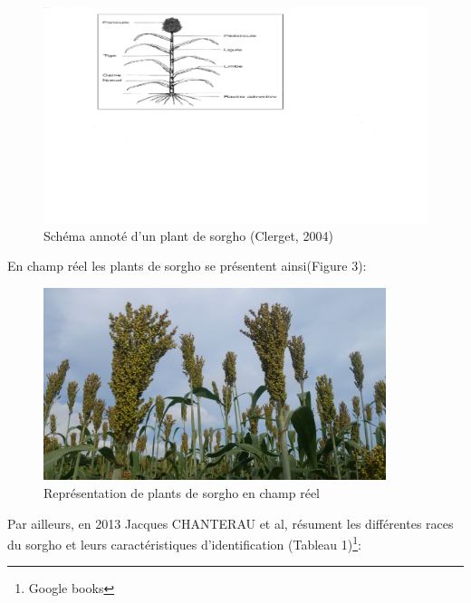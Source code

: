 \documentclass[a4paper,11pt]{article}
\begin{document}

\begin{figure}%
  \begin{center}
    \includegraphics[width=18cm]{images/Schema_Plant_Sorgho}
  \end{center}
\caption{Schéma annoté d’un plant de sorgho (Clerget, 2004)}
\end{figure}


En champ réel les plants de sorgho se présentent ainsi(Figure 3):

\begin{figure}%
  \begin{center}
    \includegraphics[width=10cm]{images/PlantDeSorgho}
  \end{center}
\caption{Représentation de plants de sorgho en champ réel}
\end{figure}

Par ailleurs, en 2013 Jacques CHANTERAU et al, résument les
différentes races du sorgho et leurs caractéristiques d'identification
(Tableau 1)\footnote{Google books}:

\end{document}
